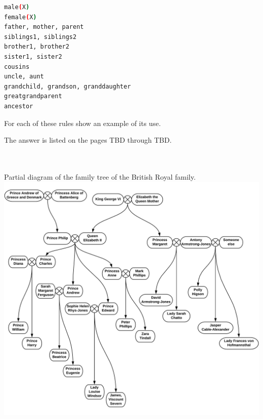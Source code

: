 \documentclass{article}
\begin{document}
	\begin{lstlisting}[language=bash]
male(X)
female(X)
father, mother, parent
siblings1, siblings2
brother1, brother2
sister1, sister2
cousins
uncle, aunt
grandchild, grandson, granddaughter
greatgrandparent
ancestor
	\end{lstlisting}
	
	For each of these rules show an example of its use.
	\newline
	
	The answer is listed on the pages TBD through TBD.
	
	
\paragraph{}\	
	
	
	\rmfamily
		Partial diagram of the family tree of the British Royal family.
		\newline
		\includegraphics[width=\textwidth+120pt]{royalfamily2}
	


\paragraph{}\
\paragraph{}\
\paragraph{}\
\end{document}
